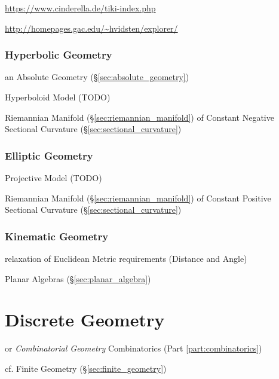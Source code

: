 \url{https://www.cinderella.de/tiki-index.php}

\url{http://homepages.gac.edu/~hvidsten/explorer/}



\subsubsection{Hyperbolic Geometry}\label{sec:hyperbolic_geometry}

an Absolute Geometry (\S\ref{sec:absolute_geometry})

Hyperboloid Model (TODO)


Riemannian Manifold (\S\ref{sec:riemannian_manifold}) of Constant Negative
Sectional Curvature (\S\ref{sec:sectional_curvature})



\subsubsection{Elliptic Geometry}\label{sec:elliptic_geometry}

Projective Model (TODO)

Riemannian Manifold (\S\ref{sec:riemannian_manifold}) of Constant Positive
Sectional Curvature (\S\ref{sec:sectional_curvature})



\subsubsection{Kinematic Geometry}\label{sec:kinematic_geometry}\hfill

relaxation of Euclidean Metric requirements (Distance and Angle)

Planar Algebras (\S\ref{sec:planar_algebra})




\section{Discrete Geometry}\label{sec:discrete_geometry}

or \emph{Combinatorial Geometry} \fist Combinatorics (Part
\ref{part:combinatorics})

cf. Finite Geometry (\S\ref{sec:finite_geometry})



